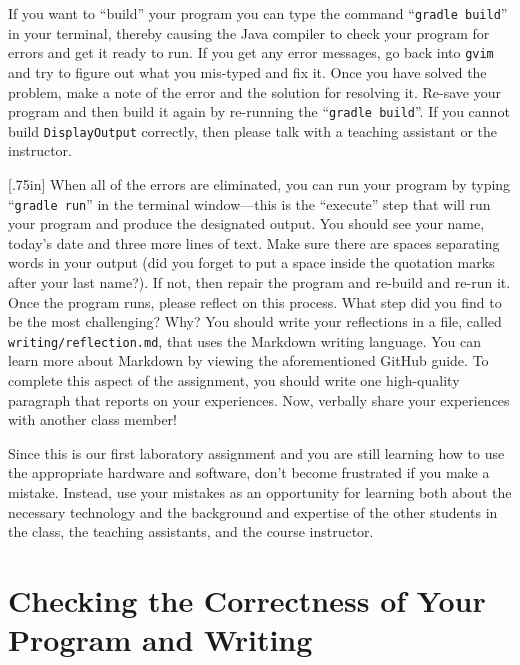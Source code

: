 \documentclass[11pt]{article}
\newcommand{\mainprogram}{\lstinline{DisplayOutput}}
\newcommand{\reflection}{\lstinline{writing/reflection.md}}
\newcommand{\gradlebuild}{\command{gradle build}}
\newcommand{\gradlerun}{\command{gradle run}}
\newcommand{\command}[1]{``\lstinline{#1}''}
\newcommand{\program}[1]{\lstinline{#1}}
\newcommand{\step}[1]{``{#1}''}
\newcommand{\think}[1]{\null\hfill\LARGE{\faCogs{}}\newline\scriptsize{\em{#1}}}
\begin{document}
If you want to \step{build} your program you can type the command
\gradlebuild{} in your terminal, thereby causing the Java compiler to check
your program for errors and get it ready to run. If you get any error messages,
go back into \program{gvim} and try to figure out what you mis-typed and fix
it. Once you have solved the problem, make a note of the error and the solution
for resolving it. Re-save your program and then build it again by re-running
the \gradlebuild{}. If you cannot build \mainprogram{} correctly, then please
talk with a teaching assistant or the instructor.

\marginnote{\think{Reflect on challenges}}[.75in] When all of the errors are
eliminated, you can run your program by typing \gradlerun{} in the terminal
window---this is the ``execute'' step that will run your program and produce
the designated output. You should see your name, today's date and three more
lines of text. Make sure there are spaces separating words in your output (did
you forget to put a space inside the quotation marks after your last name?). If
not, then repair the program and re-build and re-run it. Once the program runs,
please reflect on this process. What step did you find to be the most
challenging? Why? You should write your reflections in a file, called
\reflection{}, that uses the Markdown writing language. You can learn more
about Markdown by viewing the aforementioned GitHub guide. To complete this
aspect of the assignment, you should write one high-quality paragraph that
reports on your experiences. Now, verbally share your experiences with another
class member!

Since this is our first laboratory assignment and you are still learning how to
use the appropriate hardware and software, don't become frustrated if you make
a mistake. Instead, use your mistakes as an opportunity for learning both about
the necessary technology and the background and expertise of the other students
in the class, the teaching assistants, and the course instructor.

\section*{Checking the Correctness of Your Program and Writing}
\end{document}
